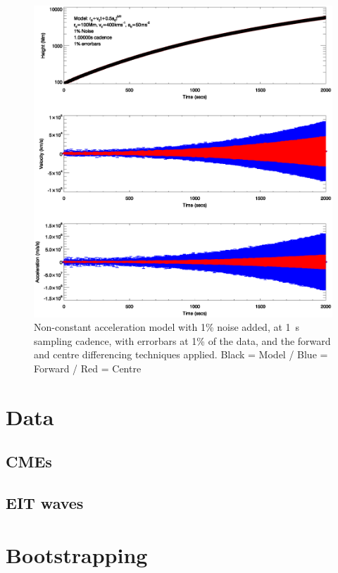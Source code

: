 \documentclass[namedreferences]{SolarPhysics}
\begin{document}
\begin{article}
\begin{figure}
 \centerline{\includegraphics[width=\linewidth]{images/nonconst_a_errorbars001_noise001_cadence1.ps}}
   \caption{Non-constant acceleration model with 1\% noise added, at 1~s sampling cadence, with errorbars at 1\% of the data, and the forward and centre differencing techniques applied. Black = Model / Blue = Forward / Red = Centre}
    \label{nonconst_a_errorbars001_noise001_cadence1}
\end{figure}


\section{Data}

\subsection{CMEs}

\subsection{EIT waves}

\section{Bootstrapping}


\end{article}
\end{document}
